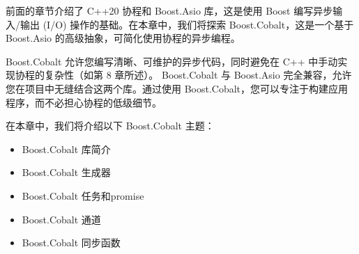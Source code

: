 前面的章节介绍了 C++20 协程和 Boost.Asio 库，这是使用 Boost 编写异步输入/输出 (I/O) 操作的基础。在本章中，我们将探索 Boost.Cobalt，这是一个基于 Boost.Asio 的高级抽象，可简化使用协程的异步编程。

Boost.Cobalt 允许您编写清晰、可维护的异步代码，同时避免在 C++ 中手动实现协程的复杂性（如第 8 章所述）。 Boost.Cobalt 与 Boost.Asio 完全兼容，允许您在项目中无缝结合这两个库。通过使用 Boost.Cobalt，您可以专注于构建应用程序，而不必担心协程的低级细节。

在本章中，我们将介绍以下 Boost.Cobalt 主题：

\begin{itemize}
\item
Boost.Cobalt 库简介

\item
Boost.Cobalt 生成器

\item
Boost.Cobalt 任务和promise

\item
Boost.Cobalt 通道

\item
Boost.Cobalt 同步函数
\end{itemize}












